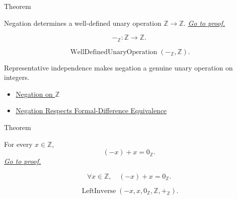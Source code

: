 \begin{theorembox}{Theorem}
\begin{theorem}
\label{thm:negation-on-z-well-defined}
Negation determines a well-defined unary operation $\mathbb{Z}\to\mathbb{Z}$.
\hyperref[prf:negation-on-z-well-defined]{\textit{Go to proof.}}
\end{theorem}
\end{theorembox}

\begin{remark*}
\[
-_{\mathbb{Z}}:\mathbb{Z}\to\mathbb{Z}.
\]
\end{remark*}

\begin{remark*}
\[
\operatorname{WellDefinedUnaryOperation}(-_{\mathbb{Z}},\mathbb{Z}).
\]
\end{remark*}

\begin{remark*}[Interpretation]
Representative independence makes negation a genuine unary operation on
integers.
\end{remark*}

\begin{dependencies}
\begin{itemize}
  \item \hyperref[def:negation-on-z-classes]{Negation on $\mathbb{Z}$}
  \item \hyperref[lem:negation-on-z-classes-respects-equivalence]{Negation Respects Formal-Difference Equivalence}
\end{itemize}
\end{dependencies}

\begin{theorembox}{Theorem}
\begin{theorem}
\label{thm:negation-left-additive-inverse-on-z}
For every $x\in\mathbb{Z}$,
\[
(-x)+x=0_{\mathbb{Z}}.
\]
\hyperref[prf:negation-left-additive-inverse-on-z]{\textit{Go to proof.}}
\end{theorem}
\end{theorembox}

\begin{remark*}
\[
\forall x\in\mathbb{Z},\quad (-x)+x=0_{\mathbb{Z}}.
\]
\end{remark*}

\begin{remark*}
\[
\operatorname{LeftInverse}(-x,x,0_{\mathbb{Z}},\mathbb{Z},+_{\mathbb{Z}}).
\]
\end{remark*}

